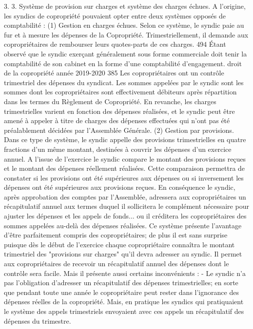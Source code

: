 3. 3. Système de provision sur charges et système des charges échues.
A l’origine, les syndics de copropriété pouvaient opter entre deux systèmes opposés de comptabilité :
(1) Gestion en charges échues.
Selon ce système, le syndic paie au fur et à mesure les dépenses de la Copropriété. Trimestriellement, il demande aux copropriétaires de rembourser leurs quotes-parts de ces charges.
494 Étant observé que le syndic exerçant généralement sous forme commerciale doit tenir la comptabilité de son cabinet en la forme d'une comptabilité d'engagement.
droit de la copropriété année 2019-2020
385
Les copropriétaires ont un contrôle trimestriel des dépenses du syndicat. Les sommes appelées par le syndic sont les sommes dont les copropriétaires sont effectivement débiteurs après répartition dans les termes du Règlement de Copropriété.
En revanche, les charges trimestrielles varient en fonction des dépenses réalisées, et le syndic peut être amené à appeler à titre de charges des dépenses effectuées qui n'ont pas été préalablement décidées par l'Assemblée Générale.
(2) Gestion par provisions.
Dans ce type de système, le syndic appelle des provisions trimestrielles en quatre fractions d'un même montant, destinées à couvrir les dépenses d'un exercice annuel.
A l'issue de l'exercice le syndic compare le montant des provisions reçues et le montant des dépenses réellement réalisées. Cette comparaison permettra de constater si les provisions ont été supérieures aux dépenses ou si inversement les dépenses ont été supérieures aux provisions reçues.
En conséquence le syndic, après approbation des comptes par l'Assemblée, adressera aux copropriétaires un récapitulatif annuel aux termes duquel il sollicitera le complément nécessaire pour ajuster les dépenses et les appels de fonds... ou il créditera les copropriétaires des sommes appelées au-delà des dépenses réalisées.
Ce système présente l'avantage d'être parfaitement compris des copropriétaires; de plus il est sans surprise puisque dès le début de l'exercice chaque copropriétaire connaîtra le montant trimestriel des "provisions sur charges" qu'il devra adresser au syndic.
Il permet aux copropriétaires de recevoir un récapitulatif annuel des dépenses dont le contrôle sera facile.
Mais il présente aussi certains inconvénients :
- Le syndic n'a pas l'obligation d'adresser un récapitulatif des dépenses trimestrielles; en sorte que pendant toute une année le copropriétaire peut rester dans l'ignorance des dépenses réelles de la copropriété. Mais, en pratique les syndics qui pratiquaient le système des appels trimestriels envoyaient avec ces appels un récapitulatif des dépenses du trimestre.
